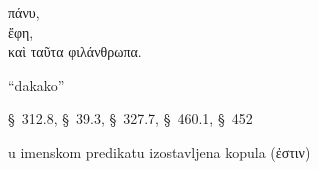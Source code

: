
{\large
\begin{greek}
\noindent πάνυ, \\
ἔφη, \\
καὶ ταῦτα φιλάνθρωπα.\\

\end{greek}
}

\begin{description}[noitemsep]
\item[πάνυ] ``dakako''
\item[ἔφη] §~312.8, §~39.3, §~327.7, §~460.1, §~452
\item[φιλάνθρωπα] u imenskom predikatu izostavljena kopula (ἐστιν)
\end{description}

